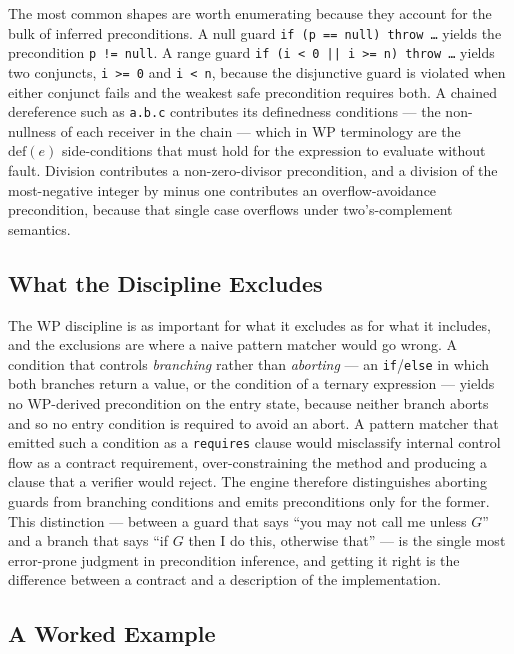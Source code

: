 The most common shapes are worth enumerating because they account for the bulk
of inferred preconditions. A null guard \texttt{if (p == null) throw \dots}
yields the precondition \texttt{p != null}. A range guard
\texttt{if (i < 0 || i >= n) throw \dots} yields two conjuncts, \texttt{i >= 0}
and \texttt{i < n}, because the disjunctive guard is violated when either
conjunct fails and the weakest safe precondition requires both. A chained
dereference such as \texttt{a.b.c} contributes its definedness conditions ---
the non-nullness of each receiver in the chain --- which in WP terminology are
the $\mathrm{def}(e)$ side-conditions that must hold for the expression to
evaluate without fault. Division contributes a non-zero-divisor precondition,
and a division of the most-negative integer by minus one contributes an
overflow-avoidance precondition, because that single case overflows under
two's-complement semantics.

\subsection{What the Discipline Excludes}

The WP discipline is as important for what it excludes as for what it includes,
and the exclusions are where a naive pattern matcher would go wrong. A
condition that controls \emph{branching} rather than \emph{aborting} --- an
\texttt{if}/\texttt{else} in which both branches return a value, or the
condition of a ternary expression --- yields no WP-derived precondition on the
entry state, because neither branch aborts and so no entry condition is
required to avoid an abort. A pattern matcher that emitted such a condition as
a \texttt{requires} clause would misclassify internal control flow as a contract
requirement, over-constraining the method and producing a clause that a
verifier would reject. The engine therefore distinguishes aborting guards from
branching conditions and emits preconditions only for the former. This
distinction --- between a guard that says ``you may not call me unless $G$''
and a branch that says ``if $G$ then I do this, otherwise that'' --- is the
single most error-prone judgment in precondition inference, and getting it
right is the difference between a contract and a description of the
implementation.

\subsection{A Worked Example}

